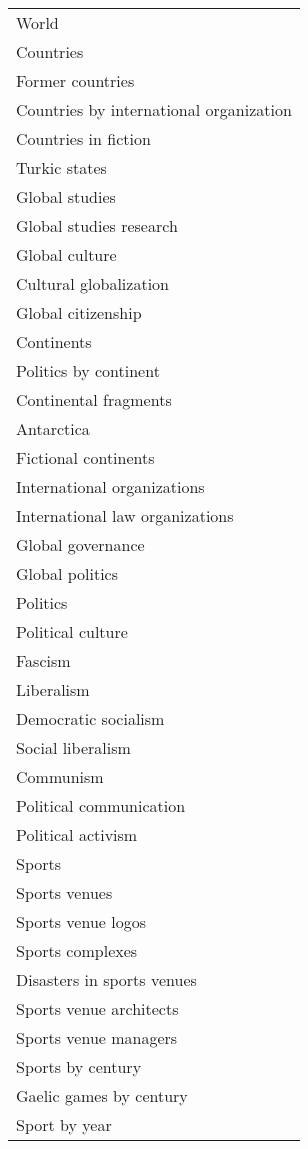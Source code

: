 \begin{table*}[h]
\centering
\begin{minipage}{0.48\textwidth}
\centering
\begin{tabular}{|l|}
\hline
World \\
Countries \\
Former countries \\
Countries by international organization \\
Countries in fiction \\
Turkic states \\
Global studies \\
Global studies research \\
Global culture \\
Cultural globalization \\
Global citizenship \\
Continents \\
Politics by continent \\
Continental fragments \\
Antarctica \\
Fictional continents \\
International organizations \\
International law organizations \\
Global governance \\
Global politics \\
Politics \\
Political culture \\
Fascism \\
Liberalism \\
Democratic socialism \\
Social liberalism \\
Communism \\
Political communication \\
Political activism \\
Sports \\
Sports venues \\
Sports venue logos \\
Sports complexes \\
Disasters in sports venues \\
Sports venue architects \\
Sports venue managers \\
Sports by century \\
Gaelic games by century \\
Sport by year \\

\end{tabular}
\end{minipage}
\end{table*}
